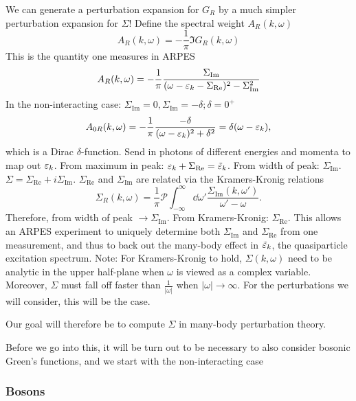We can generate a perturbation expansion for $G_R$ by a much simpler perturbation expansion for $\Sigma$!
Define the spectral weight $A_R(k,\omega)$
\begin{equation} 
\label{eq:spectral_function}
A_R(k,\omega) = -\frac{1}{\pi}\Im{G_R(k,\omega)}
\end{equation}
This is the quantity one measures in ARPES 
\begin{equation} 
A_R(k,\omega) = -\frac{1}{\pi}\frac{\Sigma_{\text{Im}}}{(\omega -\varepsilon_k -\Sigma_{\text{Re}})^2-\Sigma_{\text{Im}}^2}
\end{equation}
In the non-interacting case:
$\Sigma_{\text{Im}} = 0, \Sigma_{\text{Im}} = -\delta; \delta = 0^+$
\begin{equation} 
A_{0R}(k, \omega) = -\frac{1}{\pi}\frac{-\delta}{(\omega-\varepsilon_k)^2 + \delta^2} = \delta(\omega -\varepsilon_k),
\end{equation}
which is a Dirac $\delta$-function. Send in photons of different energies and momenta to map out $\varepsilon_k$. 
From maximum in peak: $\varepsilon_k + \Sigma_{\text{Re}} = \tilde{\varepsilon}_k$. From width of peak: $\Sigma_{\text{Im}}$.
$\Sigma = \Sigma_{\text{Re}} + i\Sigma_{\text{Im}}$. $\Sigma_{\text{Re}}$ and $\Sigma_{\text{Im}}$ are related via the Kramers-Kronig relations
\begin{equation} 
\Sigma_R(k,\omega) = \frac{1}{\pi}\mathcal{P}\int_{-\infty}^\infty\dd{\omega'}\frac{\Sigma_{\text{Im}}(k,\omega')}{\omega'-\omega}.
\end{equation}
Therefore, from width of peak $\rightarrow \Sigma_{\text{Im}}$. From Kramers-Kronig: $\Sigma_{\text{Re}}$. This allows an ARPES experiment to uniquely determine both $\Sigma_{\text{Im}}$ and $\Sigma_{\text{Re}}$ from one measurement, and thus to back out the many-body effect in  $\tilde{\varepsilon}_k$, the quasiparticle excitation spectrum. Note: For Kramers-Kronig to hold, $\Sigma(k,\omega)$ need to be analytic in the upper half-plane when $\omega$ is viewed as a complex variable. Moreover, $\Sigma$ must fall off faster than $\frac{1}{|\omega|}$ when $|\omega| \rightarrow \infty.$ For the perturbations we will consider, this will be the case. 
\begin{tcolorbox}
	Our goal will therefore be to compute $\Sigma$ in many-body perturbation theory.
\end{tcolorbox}
Before we go into this, it will be turn out to be necessary to also consider bosonic Green's functions, and we start with the non-interacting case
\subsubsection{Bosons}

